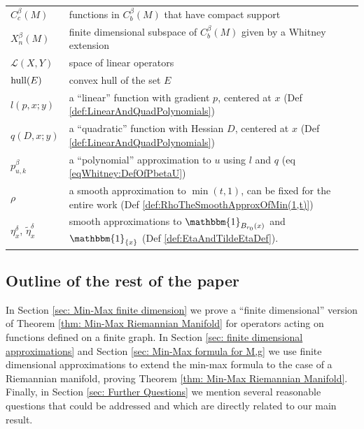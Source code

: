 \documentclass[11pt,reqno]{amsart}
\numberwithin{equation}{section}
\theoremstyle{plain}
\def\L{\mathcal L}
\def\Indicator{{\mathbbm{1}}}
\def\del{\delta}
\begin{document}
\begin{tabular}{lll}
$C^\beta_c(M)$& functions in $C^\beta_b(M)$ that have compact support \\
$X_n^\beta(M)$ & finite dimensional subspace of $C^\beta_b(M)$ given by a Whitney extension\\
$\L(X,Y)$ & space of linear operators\\
$\textnormal{hull}(E)$ & convex hull of the set $E$\\
$l(p,x;y)$ & a ``linear'' function with gradient $p$, centered at $x$ (Def \ref{def:LinearAndQuadPolynomials})\\
$q(D,x;y)$ & a ``quadratic'' function with Hessian $D$, centered at $x$ (Def \ref{def:LinearAndQuadPolynomials})\\
$p^\beta_{u,k}$ & a ``polynomial'' approximation to $u$ using $l$ and $q$ (eq \eqref{eqWhitney:DefOfPbetaU})\\
$\rho$ & a smooth approximation to $\min(t,1)$, can be fixed for the entire work (Def \ref{def:RhoTheSmoothApproxOfMin(1,t)})\\
$\eta^\del_x$, $\tilde\eta^\del_x$ & smooth approximations to $\Indicator_{B_{r_0}(x)}$ and $\Indicator_{\{x\}}$ (Def \ref{def:EtaAndTildeEtaDef}).
\end{tabular}



\subsection{Outline of the rest of the paper} In Section \ref{sec: Min-Max finite dimension} we prove a ``finite dimensional'' version of Theorem \ref{thm: Min-Max Riemannian Manifold} for operators acting on functions defined on a finite graph. In Section \ref{sec: finite dimensional approximations} and Section \ref{sec: Min-Max formula for M,g} we use finite dimensional approximations to extend the min-max formula to the case of a Riemannian manifold, proving Theorem \ref{thm: Min-Max Riemannian Manifold}. Finally, in Section \ref{sec: Further Questions} we mention several reasonable questions that could be addressed and which are directly related to our main result.


\end{document}
